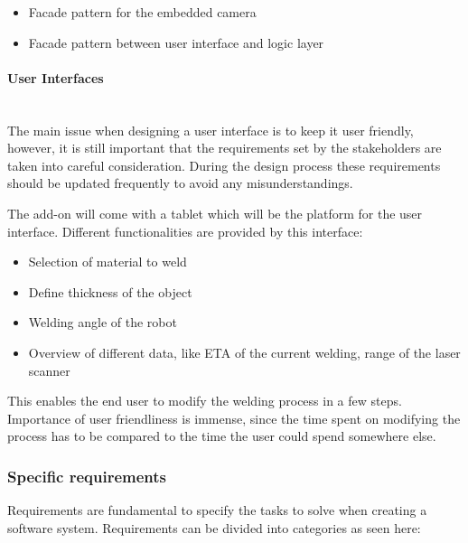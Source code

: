 \begin{itemize}

\item Facade pattern for the embedded camera
\item Facade pattern between user interface and logic layer

\end{itemize}

\paragraph*{User Interfaces}~\\
The main issue when designing a user interface is to keep it user friendly, however, it is still important that the requirements set by the stakeholders are taken into careful consideration. During the design process these requirements should be updated frequently to avoid any misunderstandings.

The add-on will come with a tablet which will be the platform for the user interface. Different functionalities are provided by this interface: 

\begin{itemize}

\item Selection of material to weld 
\item Define thickness of the object
\item Welding angle of the robot
\item Overview of different data, like ETA of the current welding, range of the laser scanner

\end{itemize}

This enables the end user to modify the welding process in a few steps. Importance of user friendliness is immense, since the time spent on modifying the process has to be compared to the time the user could spend somewhere else.

\subsubsection{Specific requirements}
Requirements are fundamental to specify the tasks to solve when creating a software system. Requirements can be divided into categories as seen here:

